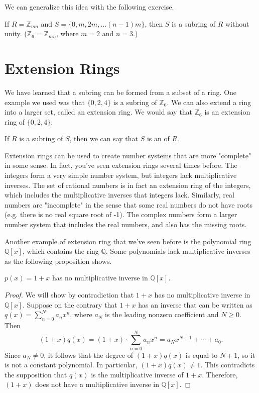 We can generalize this idea with the following exercise.

\begin{exercise}{}
If $R={\mathbb Z}_{mn}$ and $S=\{0,m,2m,...(n-1)m\}$, then $S$ is a subring of $R$ without unity. (${\mathbb Z}_6={\mathbb Z}_{mn}$, where $m=2$ and $n=3$.)  
\end{exercise}

\section{Extension Rings}
\label{sec:Rings:ExtensionRings}

We have learned that a subring can be formed from a subset of a ring. One example we used was that $\{0,2,4\}$ is a subring of ${\mathbb Z}_6$. We can also extend a ring into a larger set, called an extension ring.  We would say that ${\mathbb Z}_6$ is an extension ring of $\{0,2,4\}$.

\begin{defn}\label{ext_ring}
If $R$ is a subring of $S$, then we can say that $S$ is an  of $R$.
\end{defn}

Extension rings  can be used to create number systems that are more "complete" in some sense. In fact, you've seen extension rings several times before. The integers form a very simple number system, but integers lack multiplicative inverses. The set of rational numbers is in fact an extension ring of the integers, which includes the multiplicative inverses that integers lack.  Similarly, real numbers are "incomplete" in the sense that some real numbers do not have roots (e.g. there is no real square root of -1).  The complex numbers form a larger number system that includes the real numbers, and also has the missing roots. 

Another example of extension ring that we've seen before is the polynomial ring ${\mathbb Q}[x]$, which contains the ring ${\mathbb Q}$. Some polynomials lack multiplicative inverses as the following proposition shows.

\begin{prop}{}
$p(x)=1+x$ has no multiplicative inverse in ${\mathbb Q}[x]$.

\begin{proof}
We will show by contradiction that $1 + x$ has no  multiplicative inverse in 
${\mathbb Q}[x]$. Suppose on the contrary that $1+x$ has an inverse that can be written as $q(x) = \sum_{n=0}^{N}a_nx^n$, where $a_N$ is the leading nonzero coefficient and $N \ge 0$. Then 
\begin{equation*}
(1+x)q(x) = (1+x) \cdot \sum_{n=0}^{N}a_nx^n=a_{N}x^{N+1}+\cdots+a_0.
\end{equation*}
Since $a_N \neq 0$, it follows that the degree of $(1+x)q(x)$ is equal to $N+1$, so it is not a constant polynomial.  In particular, $(1+x)q(x) \neq 1$. This contradicts the supposition that $q(x)$ is the multiplicative inverse of $1+x$. Therefore, $(1+x)$ does not have a  multiplicative inverse in ${\mathbb Q}[x]$. 
\end{proof}
\end{prop}

